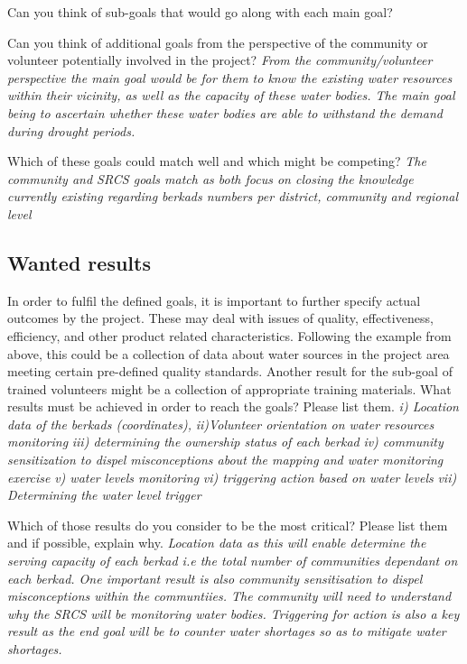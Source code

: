 Can you think of sub-goals that would go along with each main goal?

Can you think of additional goals from the perspective of the community or volunteer potentially involved in the project?\newline
\textit{From the community/volunteer perspective the main goal would be for them to know the existing water resources within their vicinity, as well as the capacity of these water bodies. The main goal being to ascertain whether these water bodies are able to withstand the demand during drought periods.}

Which of these goals could match well and which might be competing?\newline
\textit{The community and SRCS goals match as both focus on closing the knowledge currently existing regarding berkads numbers per district, community and regional level}

\subsection*{Wanted results}
In order to fulfil the defined goals, it is important to further specify actual outcomes by the project. These may deal with issues of quality, effectiveness, efficiency, and other product related characteristics. Following the example from above, this could be a collection of data about water sources in the project area meeting certain pre-defined quality standards. Another result for the sub-goal of trained volunteers might be a collection of appropriate training materials.
What results must be achieved in order to reach the goals? Please list them.\newline
\textit{i) Location data of the berkads (coordinates),}\newline
\textit{ii)Volunteer orientation on water resources monitoring}\newline
\textit{iii) determining the ownership status of each berkad}\newline
\textit{iv) community sensitization to dispel misconceptions about the mapping and water monitoring exercise}\newline
\textit{v) water levels monitoring}\newline
\textit{vi) triggering action based on water levels}\newline
\textit{vii) Determining the water level trigger}\newline

Which of those results do you consider to be the most critical? Please list them and if possible, explain why.\newline
\textit{Location data as this will enable determine the serving capacity of each berkad i.e the total number of communities dependant on each berkad. One important result is also community sensitisation to dispel misconceptions within the communtiies. The community will need to understand why the SRCS will be monitoring water bodies. Triggering for action is also a key result as the end goal will be to counter water shortages so as to mitigate water shortages.}

